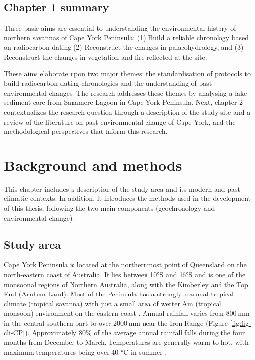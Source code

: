 \documentclass[
  12pt,
]{book}
\begin{document}
\hypertarget{chapter-1-summary}{%
\section{Chapter 1 summary}\label{chapter-1-summary}}

Three basic aims are essential to understanding the environmental history of northern savannas of Cape York Peninsula: (1) Build a reliable chronology based on radiocarbon dating (2) Reconstruct the changes in palaeohydrology, and (3) Reconstruct the changes in vegetation and fire reflected at the site.

These aims elaborate upon two major themes: the standardisation of protocols to build radiocarbon dating chronologies and the understanding of past environmental changes. The research addresses these themes by analysing a lake sediment core from Sanamere Lagoon in Cape York Peninsula. Next, chapter 2 contextualizes the research question through a description of the study site and a review of the literature on past environmental change of Cape York, and the methodological perspectives that inform this research.

\hypertarget{background-and-methods}{%
\chapter{Background and methods}\label{background-and-methods}}

This chapter includes a description of the study area and its modern and past climatic contexts. In addition, it introduces the methods used in the development of this thesis, following the two main components (geochronology and environmental change).

\hypertarget{study-area}{%
\section{Study area}\label{study-area}}

Cape York Peninsula is located at the northernmost point of Queensland on the north-eastern coast of Australia. It lies between 10°S and 16°S and is one of the monsoonal regions of Northern Australia, along with the Kimberley and the Top End (Arnhem Land). Most of the Peninsula has a strongly seasonal tropical climate (tropical savanna) \citep{peelUpdatedWorldMap2007} with just a small area of wetter Am (tropical monsoon) environment on the eastern coast \citep{peelUpdatedWorldMap2007}. Annual rainfall varies from 800 mm in the central-southern part to over 2000 mm near the Iron Range (Figure \ref{fig:fig-cli-CP}). Approximately 80\% of the average annual rainfall falls during the four months from December to March. Temperatures are generally warm to hot, with maximum temperatures being over 40 °C in summer \citep{environmentscienceservicesStageOverviewReports1995}.
\end{document}
